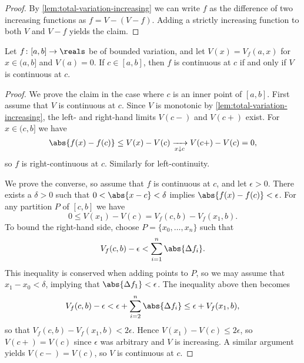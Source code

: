 \documentclass[article, a4paper, 11pt, oneside]{memoir}
\numberwithin{equation}{chapter}
\begin{document}
\begin{proof}
    By \cref{lem:total-variation-increasing} we can write $f$ as the difference of two increasing functions as $f = V - (V - f)$. Adding a strictly increasing function to both $V$ and $V - f$ yields the claim.
\end{proof}


\begin{proposition}
    \label{prop:total-variation-continuity}
    Let $f \colon [a,b] \to \reals$ be of bounded variation, and let $V(x) = V_f(a,x)$ for $x \in (a, b]$ and $V(a) = 0$. If $c \in [a,b]$, then $f$ is continuous at $c$ if and only if $V$ is continuous at $c$.
\end{proposition}

\begin{proof}
    We prove the claim in the case where $c$ is an inner point of $[a,b]$. First assume that $V$ is continuous at $c$. Since $V$ is monotonic by \cref{lem:total-variation-increasing}, the left- and right-hand limits $V(c-)$ and $V(c+)$ exist. For $x \in (c,b]$ we have
    \begin{equation*}
        \abs{f(x) - f(c)}
            \leq V(x) - V(c)
            \xrightarrow[x \downarrow c]{}
            V(c+) - V(c)
            = 0,
    \end{equation*}
    so $f$ is right-continuous at $c$. Similarly for left-continuity.

    We prove the converse, so assume that $f$ is continuous at $c$, and let $\epsilon > 0$. There exists a $\delta > 0$ such that $0 < \abs{x - c} < \delta$ implies $\abs{f(x) - f(c)} < \epsilon$. For any partition $P$ of $[c,b]$ we have
    \begin{equation*}
        0
            \leq V(x_1) - V(c)
            = V_f(c,b) - V_f(x_1,b).
    \end{equation*}
    To bound the right-hand side, choose $P = \{x_0, \ldots, x_n\}$ such that
    \begin{equation*}
        V_f(c,b) - \epsilon
            < \sum_{i=1}^n \abs{\Delta f_i}.
    \end{equation*}
    This inequality is conserved when adding points to $P$, so we may assume that $x_1 - x_0 < \delta$, implying that $\abs{\Delta f_1} < \epsilon$. The inequality above then becomes
    \begin{equation*}
        V_f(c,b) - \epsilon
            < \epsilon + \sum_{i=2}^n \abs{\Delta f_i}
            \leq \epsilon + V_f(x_1,b),
    \end{equation*}
    so that $V_f(c,b) - V_f(x_1,b) < 2\epsilon$. Hence $V(x_1) - V(c) \leq 2\epsilon$, so $V(c+) = V(c)$ since $\epsilon$ was arbitrary and $V$ is increasing. A similar argument yields $V(c-) = V(c)$, so $V$ is continuous at $c$.
\end{proof}
\end{document}
